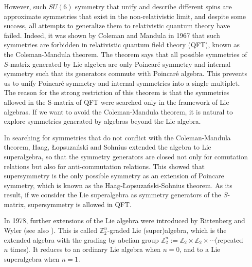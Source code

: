 \documentclass[a4paper,12pt]{article}
\def\Z{\mathbb{Z}}
\def\CM{Coleman-Mandula }
\theoremstyle{plain}
\theoremstyle{definition}
\begin{document}
However, such $SU(6)$ symmetry that unify and describe different spins are approximate symmetries that exist in the non-relativistic limit, and despite some success, all attempts to generalize them to relativistic quantum theory have failed\cite{S.C}. 
Indeed, it was shown by Coleman and Mandula in 1967 that such symmetries are forbidden in relativistic quantum field theory (QFT), known as the Coleman-Mandula theorem\cite{CM}.
The theorem says that all possible symmetries of $S$-matrix generated by Lie algebra are only Poincar\'e symmetry and internal symmetry such that its generators commute with Poincar\'e algebra.
This prevents us to unify Poincar\'e symmetry and internal symmetries into a single multiplet.
The reason for the strong restriction of this theorem is that the symmetries allowed in the S-matrix of QFT were searched only in the framework of Lie algebras. 
If we want to avoid the \CM theorem, it is natural to explore symmetries generated by  algebras beyond the Lie algebra.

In searching for symmetries that do not conflict with the Coleman-Mandula theorem, Haag, \L opsuza\'nski and Sohnius extended the algebra to Lie superalgebra, so that the symmetry generators are closed not only  for comutation relations but also for  anti-commutation relations\cite{HLS}.
This showed that supersymmetry is the only possible symmetry as an extension of Poincare symmetry, which is known as the Haag-\L opsuza\'nski-Sohnius theorem.
As its result, if we consider the Lie superalgebra as symmetry generators of the $S$-matrix, supersymmetry is allowed in QFT. 

In 1978,  further extensions of the Lie algebra were introduced by Rittenberg and Wyler \cite{RW1,RW2}(see also \cite{Ree,sch1}). This is called $\Z_2^n$-graded Lie (super)algebra, which is the extended algebra with the grading by abelian group $\Z_2^n:= \Z_2\times \Z_2 \times \cdots $(repeated $n$ times). It reduces to an ordinary Lie algebra when $n=0$,  and to a Lie superalgebra when $n=1$.
  
\end{document}
